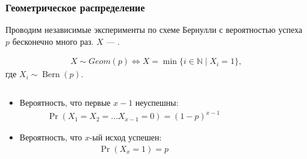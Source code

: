 \documentclass[hyperref=unicode,graphics=pdflatex,13pt,xcolor={usenames,dvipsnames}]{beamer}
\renewcommand\emph[1]{{\color{blue}{#1}}}
\newcommand\N{\mathbb{N}}
\DeclareMathOperator{\Bern}{Bern}
\begin{document}
\begin{frame}
  \frametitle{Геометрическое распределение}
  Проводим независимые эксперименты по схеме Бернулли с вероятностью успеха $p$ бесконечно много раз. $X$ --- \emph{номер первого успеха}.

  \begin{align*}
    X \sim Geom(p) \Leftrightarrow X = \min\{i \in \N \mid X_i = 1\},
  \end{align*}
  где $X_i \sim \Bern(p)$.
  
  \pause

  \begin{center}
  \end{center}

  \pause
  \begin{columns}
    \begin{column}{0.75\textwidth}
      \begin{itemize}
        \item Вероятность, что первые $x - 1$ неуспешны:
        \begin{align*}
          \Pr(X_1 = X_2 = \dots X_{x - 1} = 0) = (1 - p)^{x - 1}
        \end{align*}
        \item Вероятность, что $x$-ый исход успешен: 
        \begin{align*}
          \Pr(X_x = 1) = p 
        \end{align*}
      \end{itemize}
    \end{column}
    \begin{column}{0.25\textwidth}
    \end{column}
  \end{columns}
\end{frame}
\end{document}
